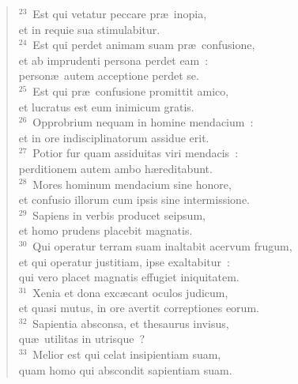 \begin{flushleft}\begin{verse}${}^{23}$~Est qui vetatur peccare pr\ae\ inopia,\\ et in requie sua stimulabitur.\\
${}^{24}$~Est qui perdet animam suam pr\ae\ confusione,\\ et ab imprudenti persona perdet eam~:\\ person\ae\ autem acceptione perdet se.\\
${}^{25}$~Est qui pr\ae\ confusione promittit amico,\\ et lucratus est eum inimicum gratis.\\
${}^{26}$~Opprobrium nequam in homine mendacium~:\\ et in ore indisciplinatorum assidue erit.\\
${}^{27}$~Potior fur quam assiduitas viri mendacis~:\\ perditionem autem ambo h\ae reditabunt.\\
${}^{28}$~Mores hominum mendacium sine honore,\\ et confusio illorum cum ipsis sine intermissione.\\
${}^{29}$~Sapiens in verbis producet seipsum,\\ et homo prudens placebit magnatis.\\
${}^{30}$~Qui operatur terram suam inaltabit acervum frugum,\\ et qui operatur justitiam, ipse exaltabitur~:\\ qui vero placet magnatis effugiet iniquitatem.\\
${}^{31}$~Xenia et dona exc\ae cant oculos judicum,\\ et quasi mutus, in ore avertit correptiones eorum.\\
${}^{32}$~Sapientia absconsa, et thesaurus invisus,\\ qu\ae\ utilitas in utrisque~?\\
${}^{33}$~Melior est qui celat insipientiam suam,\\ quam homo qui abscondit sapientiam suam.\end{verse}\end{flushleft}



